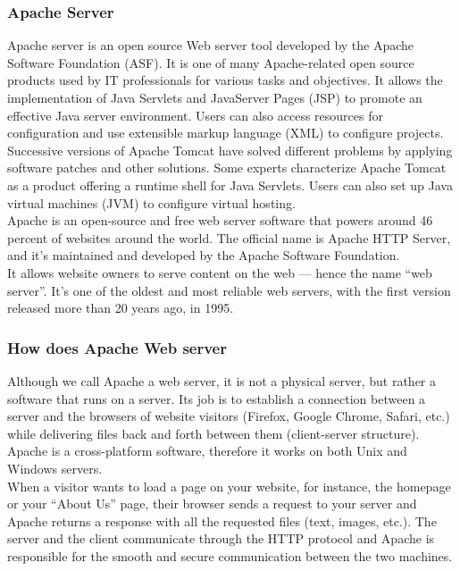 \documentclass[12pt,a4paper]{article}
\newcommand\tab[1][1cm]{\hspace*{#1}}
\begin{document}
\subsubsection{Apache Server}
	\tab Apache server\cite{Ref:8} is an open source Web server tool developed by the Apache Software
Foundation (ASF). It is one of many Apache-related open source products used by IT
professionals for various tasks and objectives. It allows the implementation of Java
Servlets and JavaServer Pages (JSP) to promote an effective Java server environment.
Users can also access resources for configuration and use extensible markup language
(XML) to configure projects. Successive versions of Apache Tomcat have solved different
problems by applying software patches and other solutions. Some experts characterize
Apache Tomcat as a product offering a runtime shell for Java Servlets. Users can also set
up Java virtual machines (JVM) to configure virtual hosting.\\

\tab Apache is an open-source and free web server software that powers around 46 percent of websites around the world. The official name is Apache HTTP Server, and it’s maintained and developed by the Apache Software Foundation.\\

\tab It allows website owners to serve content on the web — hence the name “web server”. It’s one of the oldest and most reliable web servers, with the first version released more than 20 years ago, in 1995.\\

		\subsubsection{How does Apache Web server}
		\tab Although we call Apache a web server, it is not a physical server, but rather a software that runs on a server. Its job is to establish a connection between a server and the browsers of website visitors (Firefox, Google Chrome, Safari, etc.) while delivering files back and forth between them (client-server structure). Apache is a cross-platform software, therefore it works on both Unix and Windows servers.\\

\tab When a visitor wants to load a page on your website, for instance, the homepage or your “About Us” page, their browser sends a request to your server and Apache returns a response with all the requested files (text, images, etc.). The server and the client communicate through the HTTP protocol and Apache is responsible for the smooth and secure communication between the two machines.\\
\end{document}
